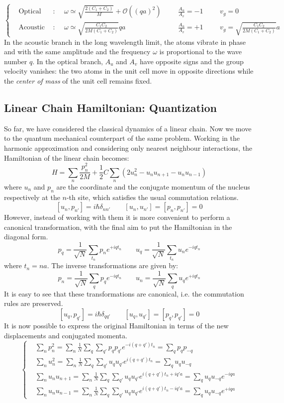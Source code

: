 \documentclass[10.75pt,a4paper,openright,bottom=2cm]{article}
\newcommand{\RN}[1]{%
  \textup{\uppercase\expandafter{\romannumeral#1}}%
}
\begin{document}
\[
\left\{
\begin{aligned}
&\text{Optical branch}: &&\omega\simeq\sqrt{\frac{2(C_1+C_2)}{M}}+\mathcal{O}((qa)^2) &&&\frac{A_u}{A_v}=-1 &&&v_g=0\\
&\text{Acoustic branch}: &&\omega\simeq\sqrt{\frac{C_1C_2}{2M(C_1+C_2)}}qa &&&\frac{A_u}{A_v}=+1 &&&v_g=\sqrt{\frac{C_1C_2}{2M(C_1+C_2)}}a
\end{aligned}
\right.
\]
In the acoustic branch in the long wavelength limit, the atoms vibrate in phase and with the same amplitude and the frequency $\omega$ is proportional to the wave number $q$. In the optical branch, $A_u$ and $A_v$ have opposite signs and the group velocity vanishes: the two atoms in the unit cell move in opposite directions while the \textit{center of mass} of the unit cell remains fixed.
\subsection{Linear Chain Hamiltonian: \RN{1} Quantization}
So far, we have considered the classical dynamics of a linear chain. Now we move to the quantum mechanical counterpart of the same problem. Working in the harmonic approximation and considering only nearest neighbour interactions, the Hamiltonian of the linear chain becomes:
\begin{equation}
\label{H}
H=\sum_n\frac{p_n^2}{2M}+\frac{1}{2}C\sum_n(2u_n^2-u_nu_{n+1}-u_nu_{n-1})
\end{equation}
where $u_n$ and $p_n$ are the coordinate and the conjugate momentum of the nucleus respectively at the $n$-th site, which satisfies the usual commutation relations.
\[
[u_n,p_{n'}]=i\hbar\delta_{nn'} \qquad [u_n,u_{n'}]=[p_n,p_{n'}]=0
\]
However, instead of working with them it is more convenient to perform a canonical transformation, with the final aim to put the Hamiltonian in the diagonal form.
\[
p_q=\frac{1}{\sqrt{N}}\sum_{t_n}p_ne^{+iqt_n} \qquad u_q=\frac{1}{\sqrt{N}}\sum_{t_n}u_ne^{-iqt_n}
\]
where $t_n=na$. The inverse transformations are given by:
\[
p_n=\frac{1}{\sqrt{N}}\sum_qp_qe^{-iqt_n} \qquad u_n=\frac{1}{\sqrt{N}}\sum_qu_qe^{+iqt_n}
\]
It is easy to see that these transformations are canonical, i.e. the commutation rules are preserved.
\[
[u_q,p_{q'}]=i\hbar\delta_{qq'} \qquad [u_q,u_{q'}]=[p_q,p_{q'}]=0
\]
It is now possible to express the original Hamiltonian in terms of the new displacements and conjugated momenta.
\[
\left\{
\begin{aligned}
&\sum_np_n^2=\sum_n\frac{1}{N}\sum_q\sum_{q'}p_qp_{q'}e^{-i(q+q')t_n}=\sum_qp_qp_{-q}\\
&\sum_nu_n^2=\sum_n\frac{1}{N}\sum_q\sum_{q'}u_qu_{q'}e^{i(q+q')t_n}=\sum_qu_qu_{-q}\\
&\sum_nu_nu_{n+1}=\sum_n\frac{1}{N}\sum_q\sum_{q'}u_qu_{q'}e^{i(q+q')t_n+iq'a}=\sum_qu_qu_{-q}e^{-iqa}\\
&\sum_nu_nu_{n-1}=\sum_n\frac{1}{N}\sum_q\sum_{q'}u_qu_{q'}e^{i(q+q')t_n-iq'a}=\sum_qu_qu_{-q}e^{+iqa}
\end{aligned}
\right.
\]
\end{document}
